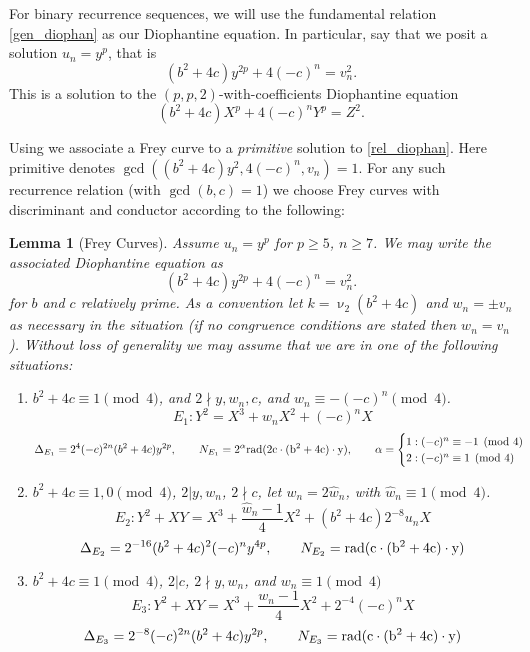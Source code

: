 \documentclass[12pt]{amsart}
\newtheorem{lem}[thm]{Lemma}
\theoremstyle{definition}
\newcommand{\rad}{\rm rad}
\newcommand{\notdiv}{\nmid}
\begin{document}
For binary recurrence sequences, we will use the fundamental relation \eqref{gen_diophan} as our Diophantine equation.  In particular, say that we posit a solution $u_n = y^p$, that is
\begin{equation}\label{rel_diophan} (b^2+4c)y^{2p}+4(-c)^n = v_n^2 .\end{equation}
This is a solution to the $(p,p,2)$-with-coefficients Diophantine equation
\[ (b^2+4c)X^p +4(-c)^nY^p = Z^2. \]

Using \cite{bennett04} we associate a Frey curve to a \textit{primitive} solution to \eqref{rel_diophan}.  Here primitive denotes $\gcd((b^2+4c)y^2, 4(-c)^n, v_n ) = 1$.  For any such recurrence relation (with $\gcd(b,c)=1$) we choose Frey curves with discriminant and conductor according to the following:

\begin{lem}[Frey Curves]\label{freycurves}
Assume $u_n = y^p$ for $p\geq 5$, $n \geq 7$.  We may write the associated Diophantine equation as
\[ (b^2+4c)y^{2p} + 4(-c)^n = v_n^2.\]
for $b$ and $c$ relatively prime. As a convention let $k = \upnu_2(b^2+4c)$ and $w_n = \pm v_n$ as necessary in the situation (if no congruence conditions are stated then $w_n = v_n$).  Without loss of generality we may assume that we are in one of the following situations:



\begin{enumerate}[1.]

\item $b^2+4c \equiv 1 \pmod{4}$, and $2 \notdiv y,w_n,c$, and $w_n \equiv -(-c)^n \pmod{4}$.
\[ E_1: Y^2 = X^3 + w_nX^2 + (-c)^nX \]
\[ \Delta_{E_1} = 2^4(-c)^{2n}(b^2+4c)y^{2p},  \qquad N_{E_1} = 2^{\alpha} \rad(2c \cdot (b^2+4c) \cdot y), \qquad \alpha =  \begin{cases} 1: (-c)^n \equiv -1 \pmod{4}\\ 2 : (-c)^n \equiv 1 \pmod{4} \end{cases} \]

\item $b^2+4c \equiv 1,0 \pmod{4}$, $2|y,w_n$, $2 \notdiv c$, let $w_n = 2\hat{w}_n$, with $\hat{w}_n \equiv 1 \pmod{4}$.
\[ E_{2} : Y^2 +XY = X^3 + \frac{\hat{w}_n - 1}{4} X^2 + (b^2+4c)2^{-8}u_nX \]
\[ \Delta_{E_2} = 2^{-16}(b^2+4c)^2(-c)^ny^{4p}, \qquad N_{E_2} = \rad( c \cdot (b^2+4c)\cdot y)  \]

\item $b^2+4c \equiv 1 \pmod{4}$, $2|c$, $2 \notdiv y,w_n$, and $w_n \equiv 1 \pmod{4}$
\[ E_{3}: Y^2 +XY = X^3 +\frac{w_n-1}{4}X^2 +2^{-4}(-c)^nX \]
\[ \Delta_{E_3} = 2^{-8}(-c)^{2n}(b^2+4c)y^{2p} , \qquad N_{E_3} =\rad( c \cdot (b^2+4c)\cdot y)  \]


\end{enumerate}
\end{lem}
\end{document}
